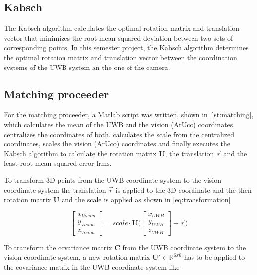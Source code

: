 \subsection{Kabsch}
The Kabsch algorithm \cite{Kabsch:a12999} calculates the optimal rotation matrix and translation vector that minimizes the root mean squared deviation between two sets of corresponding points. In this semester project, the Kabsch algorithm determines the optimal rotation matrix and translation vector between the coordination systems of the UWB system an the one of the camera.

\subsection{Matching proceeder}\label{subsec:matching}
For the matching proceeder, a Matlab script was written, shown in \autoref{lst:matching}, which calculates the mean of the UWB and the vision (ArUco) coordinates, centralizes the coordinates of both, calculates the scale from the centralized coordinates, scales the vision (ArUco) coordinates and finally executes the Kabsch algorithm to calculate the rotation matrix $\textbf{U}$, the translation $\vec r$ and the least root mean squared error $\text{lrms}$.

To transform 3D points from the UWB coordinate system to the vision coordinate system the translation $\vec r$ is applied to the 3D coordinate and the then rotation matrix $\textbf{U}$ and the scale is applied as shown in \autoref{eq:transformation}

\begin{equation}\label{eq:transformation}
	\begin{bmatrix}
		x_{\textit{Vision}} \\
		y_{\textit{Vision}} \\
		z_{\textit{Vision}}
	\end{bmatrix} = \mathit{scale} \cdot \textbf{U}
	\Bigg( \begin{bmatrix}
		x_{\textit{UWB}} \\
		y_{\textit{UWB}} \\
		z_{\textit{UWB}}
	\end{bmatrix} - \vec r \Bigg)
\end{equation}

To transform the covariance matrix $\textbf{C}$ from the UWB coordinate system to the vision coordinate system, a new rotation matrix $\textbf{U}' \in \mathbb{R}^{6x6}$ has to be applied to the covariance matrix in the UWB coordinate system like

